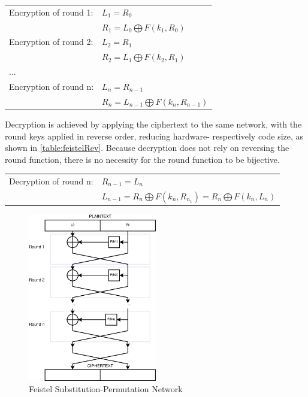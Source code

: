 \begin{center}
\begin{tabular}{ l l}
 \label{table:feistel}
  Encryption of round 1: & $L_1 = R_0$  \\ 
   &  $R_1 = L_0 \bigoplus F(k_1, R_0)$\\ \hline
  Encryption of round 2: & $L_{2} = R_1$  \\
   &  $R_{2} = L_1 \bigoplus F(k_2, R_1)$ \\ \hline
   ... &  \\ \hline
   Encryption of round n: & $L_{n} = R_{n-1}$ \\
   & $R_n = L_{n-1} \bigoplus F(k_n, R_{n-1})$ \\
\end{tabular}
\end{center}

Decryption is achieved by applying the ciphertext to the same network, with the round keys applied in reverse order, reducing hardware- respectively
code size, as shown in \ref{table:feistelRev}. Because decryption does not rely on reversing the round function, there is no necessity for the round function to be bijective.
\\

\begin{center}
\begin{tabular}{ l l}
 \label{table:feistelRev}
Decryption of round n: & $R_{n-1} = L_n$  \\
 & $L_{n-1} = R_n \bigoplus F(k_n, R_{n_1}) = R_n \bigoplus F(k_n, L_{n}) $
\end{tabular}
\end{center}

\begin{figure}
    \centering
    \includegraphics[width=0.5\textwidth]{figures/feistel.eps}
    \caption{Feistel Substitution-Permutation Network}
    \label{fig:feistel}
\end{figure}

